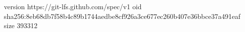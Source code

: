version https://git-lfs.github.com/spec/v1
oid sha256:8eb68db7f58b4c89b1744aedbe8cf926a3ce677ec260b407e36bbce37a491eaf
size 393312

